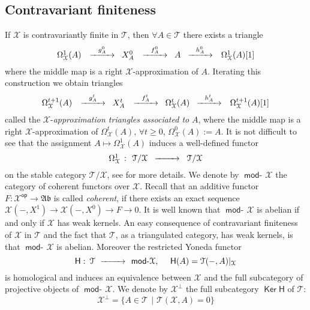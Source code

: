 \documentclass[oneside, a4paper,reqno]{amsart}
\numberwithin{equation}{section}
\theoremstyle{definition}
\begin{document}
\subsection{Contravariant finiteness} If ${\mathcal X}$ is contravariantly finite in ${\mathcal T}$, then $\forall A \in {\mathcal T}$ there exists a triangle 
\begin{equation}
\begin{CD}
\Omega^{1}_{\mathcal X}(A) \,\ @> g^{0}_{A} >>  \,\, X^{0}_{A} \,\ @> f^{0}_{A} >> \,\, A \,\, @> h^{0}_{A} >>  \,\ \Omega^{1}_{\mathcal X}(A)[1]
\end{CD}
\end{equation}
where the middle map is a right ${\mathcal X}$-approximation of $A$. Iterating this construction we obtain triangles 
\[
\begin{CD}
\Omega^{t+1}_{\mathcal X}(A) \,\ @> g^{t}_{A} >>  \,\, X^{t}_{A} \,\ @> f^{t}_{A} >>  \,\, \Omega^{t}_{\mathcal X}(A) \,\, @> h^{t}_{A} >>  \,\ \Omega^{t+1}_{\mathcal X}(A)[1]
\end{CD}
\]
called the ${\mathcal X}$-{\em approximation triangles associated to} $A$, where the middle map is a right ${\mathcal X}$-approximation of $\Omega^{t}_{\mathcal X}(A)$, $\forall t \geq 0$, $\Omega^{0}_{\mathcal X}(A) := A$.  It is not difficult to see that the assignment $A \longmapsto \Omega^{1}_{\mathcal X}(A)$ induces a well-defined functor 
\[
\begin{CD}
\Omega^{1}_{\mathcal X} \,\, \colon \,\, {\mathcal T}/{\mathcal X} \,\, @> >>  \,\, {\mathcal T}/{\mathcal X}
\end{CD}
\]
on the stable category ${\mathcal T}/{\mathcal X}$, see \cite{B} for more details.  We denote by $\operatorname*{\mathsf{mod}-\!}{\mathcal X}$ the category of coherent functors over ${\mathcal X}$. Recall that an additive functor $F \colon {\mathcal X}^\operatorname*{\mathsf{op}} {\longrightarrow} \mathfrak{Ab}$ is called {\em coherent}, if there exists an exact sequence ${\mathcal X}(-,X^{1}) {\longrightarrow} {\mathcal X}(-,X^{0}) {\longrightarrow} F {\longrightarrow} 0$. It is well known that $\operatorname*{\mathsf{mod}-\!}{\mathcal X}$ is abelian if and only if ${\mathcal X}$ has weak kernels. An easy consequence of contravariant finiteness of ${\mathcal X}$ in ${\mathcal T}$ and the fact that ${\mathcal T}$, as a triangulated category, has weak kernels, is that $\operatorname*{\mathsf{mod}-\!}{\mathcal X}$ is abelian. Moreover the restricted Yoneda functor  
\[
\begin{CD}
\mathsf{H} \, \colon \, {\mathcal T} \, @> >> \, \operatorname*{\mathsf{mod}-\!}{\mathcal X}, \,\,\,\, \ \  \mathsf{H}(A) = {\mathcal T}(-,A)|_{\mathcal X}
\end{CD} 
\] 
is homological and induces an equivalence between ${\mathcal X}$ and the full subcategory of projective objects of $\operatorname*{\mathsf{mod}-\!}{\mathcal X}$. We denote by ${\mathcal X}^{\bot}$ the full subcategory $\operatorname*{\mathsf{Ker}} \mathsf{H}$ of ${\mathcal T}$:
\[
{\mathcal X}^{\bot} = \big\{A \in {\mathcal T} \,\ | \,\, {\mathcal T}({\mathcal X},A) = 0\big\}
\]
 
\end{document}
